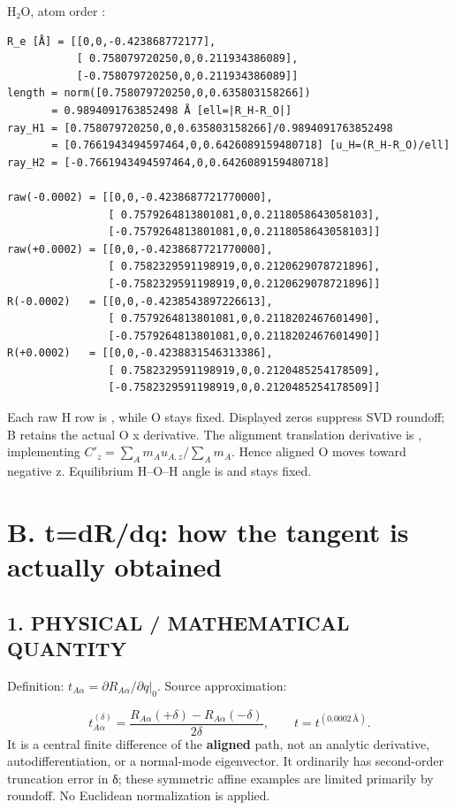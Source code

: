\documentclass[10pt,a4paper]{article}
\begin{document}
H₂O, atom order \code{[O,H,H]}:

\begin{Verbatim}
R_e [Å] = [[0,0,-0.423868772177],
           [ 0.758079720250,0,0.211934386089],
           [-0.758079720250,0,0.211934386089]]
length = norm([0.758079720250,0,0.635803158266])
       = 0.9894091763852498 Å [ell=|R_H-R_O|]
ray_H1 = [0.758079720250,0,0.635803158266]/0.9894091763852498
       = [0.7661943494597464,0,0.6426089159480718] [u_H=(R_H-R_O)/ell]
ray_H2 = [-0.7661943494597464,0,0.6426089159480718]

raw(-0.0002) = [[0,0,-0.4238687721770000],
                [ 0.7579264813801081,0,0.2118058643058103],
                [-0.7579264813801081,0,0.2118058643058103]]
raw(+0.0002) = [[0,0,-0.4238687721770000],
                [ 0.7582329591198919,0,0.2120629078721896],
                [-0.7582329591198919,0,0.2120629078721896]]
R(-0.0002)   = [[0,0,-0.4238543897226613],
                [ 0.7579264813801081,0,0.2118202467601490],
                [-0.7579264813801081,0,0.2118202467601490]]
R(+0.0002)   = [[0,0,-0.4238831546313386],
                [ 0.7582329591198919,0,0.2120485254178509],
                [-0.7582329591198919,0,0.2120485254178509]]
\end{Verbatim}
Each raw H row is , while O stays fixed. Displayed zeros suppress SVD roundoff; B retains the actual O x derivative. The alignment translation derivative is , implementing \(C'_z=\sum_A m_Au_{A,z}/\sum_A m_A\). Hence aligned O moves toward negative z. Equilibrium H–O–H angle is  and stays fixed.

\clearpage
\section{B. t=dR/dq: how the tangent is actually obtained}
\subsection{1. PHYSICAL / MATHEMATICAL QUANTITY}
Definition: \(t_{A\alpha}=\partial R_{A\alpha}/\partial q|_0\). Source approximation:

\[
t^{(\delta)}_{A\alpha}=\frac{R_{A\alpha}(+\delta)-R_{A\alpha}(-\delta)}{2\delta},\qquad t=t^{(0.0002\,\text{Å})}.
\]
It is a central finite difference of the \textbf{aligned} path, not an analytic derivative, autodifferentiation, or a normal-mode eigenvector. It ordinarily has second-order truncation error in δ; these symmetric affine examples are limited primarily by roundoff. No Euclidean normalization is applied.
\end{document}
